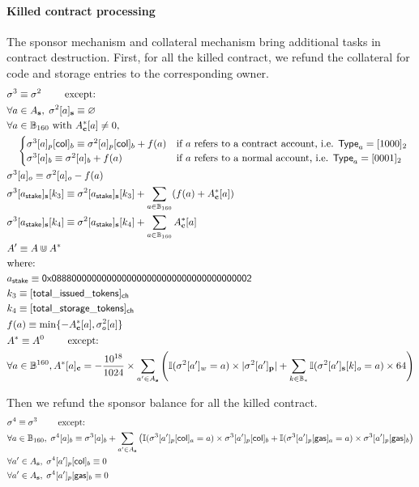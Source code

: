 \paragraph{Killed contract processing} The sponsor mechanism and collateral mechanism bring additional tasks in contract destruction. First, for all the killed contract, we refund the collateral for code and storage entries to the corresponding owner. 
\begin{align}
& \st^3  \eqdef \st^2 \qquad \mbox{  except:}\\
& \forall a \in A_{\bf s},\; \st^2[a]_{\bf s} \eqdef \varnothing \\
&\forall a \in \B_{160} \text{ with }  A^*_{\bf c}[a]\neq 0, \\
&\quad \begin{cases}
\st^3[a]_p[{\sf col}]_b \eqdef \st^2[a]_p[{\sf col}]_b + f(a) & \mbox{if $a$ refers to a contract account, i.e. $\mathsf{Type}_{a}=\typecontract$} \\
\st^3[a]_b \eqdef \st^2[a]_b + f(a) & \mbox{if $a$ refers to a normal account, i.e. $\mathsf{Type}_{a}= \typenormal$}
\end{cases}\\
& \st^3[a]_o \eqdef \st^2[a]_o - f(a)\\ 
&\st^3[a_{\sf stake}]_{\bf s}[k_3] \eqdef \st^2[a_{\sf stake}]_{\bf s}[k_3] + \sum_{a\in \B_{160}}(f(a) + A^*_{\bf c}[a]) \\
&\st^3[a_{\sf stake}]_{\bf s}[k_4] \eqdef \st^2[a_{\sf stake}]_{\bf s}[k_4] + \sum_{a\in \B_{160}}A^*_{\bf c}[a] \\
& A' \eqdef A \Cup A^* \\ 
&\mbox{where:}  \\
&a_{\sf stake} \eqdef \stakingcontract \\ 
&k_3 \eqdef {\sf [total\char`_issued\char`_tokens]_{\sf ch}}  \\ 
&k_4 \eqdef {\sf [total\char`_storage\char`_tokens]_{\sf ch}}  \\ 
& f(a) \eqdef \min\{-A^*_{\bf c}[a], \st^2_o[a]\} \\
& A^* \eqdef A^0 \qquad \mbox{  except:}\\
& \forall a \in \B^{160}, A^*[a]_{\bf c} = - \collateralperbyte \times \sum_{a'\in A_{\bf s}}\left(\mathbb{I}(\st^2[a']_{w}=a) \times |\st^2[a']_{\bf p}| + \sum_{k\in \B_*} \mathbb{I}(\st^2[a']_{\bf s}[k]_o=a)\times 64\right) 
\end{align}

Then we refund the sponsor balance for all the killed contract. 
%
\begin{align}
&\mathbf{\sigma}^4  \equiv \mathbf{\sigma}^3 \qquad \mbox{  except:}\\
&\forall a \in \mathbb{B}_{160},\;  \mathbf{\sigma}^4[a]_b\equiv \mathbf{\sigma}^3[a]_b + \sum_{a'\in A_{\bf s}} \left(\mathbb{I}(\mathbf{\sigma}^3[a']_p[{\sf col}]_a=a)\times \mathbf{\sigma}^3[a']_p[{\sf col}]_b + \mathbb{I}(\mathbf{\sigma}^3[a']_p[{\sf gas}]_a=a)\times \mathbf{\sigma}^3[a']_p[{\sf gas}]_b \right)\\
&\forall a' \in A_{\bf s},\; \mathbf{\sigma}^4[a']_p[{\sf col}]_b\equiv 0 \\
&\forall a' \in A_{\bf s},\; \mathbf{\sigma}^4[a']_p[{\sf gas}]_b\equiv 0
\end{align}

